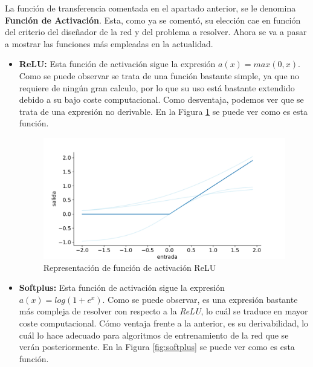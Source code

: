 La función de transferencia comentada en el apartado anterior, se le denomina \textbf{Función de Activación}. Esta, como ya se comentó, su elección cae en función del criterio del diseñador de la red y del problema a resolver. Ahora se va a pasar a mostrar las funciones más empleadas en la actualidad.

\begin{itemize}
    \item \textbf{ReLU:} Esta función de activación sigue la expresión $a(x) = max(0,x)$. Como se puede observar se trata de una función bastante simple, ya que no requiere de ningún gran calculo, por lo que su uso está bastante extendido debido a su bajo coste computacional. Como desventaja, podemos ver que se trata de una expresión no derivable. En la Figura \ref{fig:relu} se puede ver como es esta función.
    
    \begin{figure}[!ht]
    \centering
    \includegraphics[width=\textwidth]{figuras/desarrollo teorico/relu.pdf}
    \caption{Representación de función de activación ReLU}
    \label{fig:relu}
    \end{figure}

    
    \item \textbf{Softplus:} Esta función de activación sigue la expresión $a(x) = log(1 + e^x)$. Como se puede observar, es una expresión bastante más compleja de resolver con respecto a la \textit{ReLU}, lo cuál se traduce en mayor coste computacional. Cómo ventaja frente a la anterior, es su derivabilidad, lo cuál lo hace adecuado para algoritmos de entrenamiento de la red que se verán posteriormente. En la Figura \ref{fig:softplus} se puede ver como es esta función.
    

\end{itemize}
